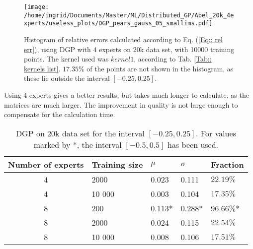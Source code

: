 \documentclass[twoside,english]{uiofysmaster}
\begin{document}
 
 
 
\begin{figure}
\centering
\texttt{[image: /home/ingrid/Documents/Master/ML/Distributed\_GP/Abel\_20k\_4experts/useless\_plots/DGP\_pears\_gauss\_05\_smallims.pdf]}
\caption{Histogram of relative errors calculated according to Eq. (\ref{Eq:: rel err}), using DGP with 4 experts on 20k data set, with 10000 training points. The kernel used was $kernel1$, according to Tab. \ref{Tab:: kernels list}. $17.35 \%$ of the points are not shown in the histogram, as these lie outside the interval $[-0.25, 0.25]$.}
\label{Fig:: DGP 20k 10000training kernel1}
\end{figure}
 

 
Using 4 experts gives a better results, but takes much longer to calculate, as the matrices are much larger. The improvement in quality is not large enough to compensate for the calculation time. 
 
\begin{table}
\centering
\begin{tabular}{|c|l|l|l|l|}
\hline
Number of experts & Training size & $\mu$ & $\sigma$ & Fraction\\
\hline
4 & 2000 & 0.023 & 0.111 & $22.19 \%$\\
4 & 10 000 & 0.003 & 0.104 & $17.35 \%$\\
8 & 200 & 0.113* & 0.288*  & $96.66 \%$* \\
8 & 2000 & 0.024 & 0.115 & $22.54 \%$\\
8 & 10 000 & 0.008 & 0.106 & $17.51 \%$\\
\hline
\end{tabular}
\caption{DGP on 20k data set for the interval $[-0.25, 0.25]$. For values marked by *, the interval $[-0.5,0.5]$ has been used.}
\label{Tab:: DGP comparison of mu sigma for 4 8 exp}
\end{table}
\end{document}

